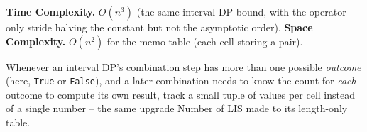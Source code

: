 \begin{complexitybox}
\textbf{Time Complexity.} $O(n^3)$ (the same interval-DP bound, with
the operator-only stride halving the constant but not the asymptotic
order).
\textbf{Space Complexity.} $O(n^2)$ for the memo table (each cell
storing a pair).
\end{complexitybox}

\begin{takeawaybox}
Whenever an interval DP's combination step has more than one possible
\emph{outcome} (here, \texttt{True} or \texttt{False}), and a later
combination needs to know the count for \emph{each} outcome to compute
its own result, track a small tuple of values per cell instead of a
single number -- the same upgrade Number of LIS made to its
length-only table.
\end{takeawaybox}
